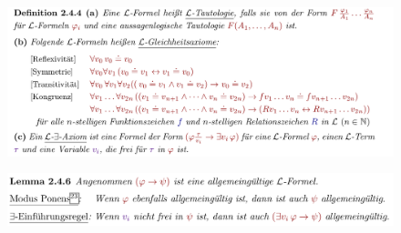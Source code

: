 \documentclass[a4paper]{scrartcl}
\begin{document}
    \begin{figure}[H]
        \centering
        \includegraphics[scale=0.3]{./Allg.png}
        \label{fig:./Allg}
    \end{figure}

    \begin{figure}[H]
        \centering
        \includegraphics[scale=0.3]{./MP.png}
        \label{fig:./MP}
    \end{figure}
\end{document}
